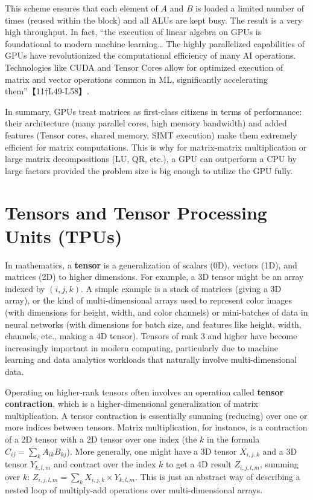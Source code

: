 This scheme ensures that each element of $A$ and $B$ is loaded a limited number of times (reused within the block) and all ALUs are kept busy. The result is a very high throughput. In fact, “the execution of linear algebra on GPUs is foundational to modern machine learning… The highly parallelized capabilities of GPUs have revolutionized the computational efficiency of many AI operations. Technologies like CUDA and Tensor Cores allow for optimized execution of matrix and vector operations common in ML, significantly accelerating them”【11†L49-L58】. 

In summary, GPUs treat matrices as first-class citizens in terms of performance: their architecture (many parallel cores, high memory bandwidth) and added features (Tensor cores, shared memory, SIMT execution) make them extremely efficient for matrix computations. This is why for matrix-matrix multiplication or large matrix decompositions (LU, QR, etc.), a GPU can outperform a CPU by large factors provided the problem size is big enough to utilize the GPU fully.

\section{Tensors and Tensor Processing Units (TPUs)}  
In mathematics, a \textbf{tensor} is a generalization of scalars (0D), vectors (1D), and matrices (2D) to higher dimensions. For example, a 3D tensor might be an array indexed by $(i,j,k)$. A simple example is a stack of matrices (giving a 3D array), or the kind of multi-dimensional arrays used to represent color images (with dimensions for height, width, and color channels) or mini-batches of data in neural networks (with dimensions for batch size, and features like height, width, channels, etc., making a 4D tensor). Tensors of rank 3 and higher have become increasingly important in modern computing, particularly due to machine learning and data analytics workloads that naturally involve multi-dimensional data.

Operating on higher-rank tensors often involves an operation called \textbf{tensor contraction}, which is a higher-dimensional generalization of matrix multiplication. A tensor contraction is essentially summing (reducing) over one or more indices between tensors. Matrix multiplication, for instance, is a contraction of a 2D tensor with a 2D tensor over one index (the $k$ in the formula $C_{ij} = \sum_k A_{ik} B_{kj}$). More generally, one might have a 3D tensor $X_{i,j,k}$ and a 3D tensor $Y_{k,l,m}$ and contract over the index $k$ to get a 4D result $Z_{i,j,l,m}$, summing over $k$: $Z_{i,j,l,m} = \sum_{k} X_{i,j,k} \times Y_{k,l,m}$. This is just an abstract way of describing a nested loop of multiply-add operations over multi-dimensional arrays.

